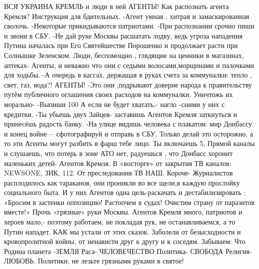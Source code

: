 \obeycr
ВСЯ УКРАИНА КРЕМЛЬ и 
люди в ней АГЕНТЫ!
Как распознать агента Кремля? 
Инструкция для бдительных.
-Агент умная  , хитрая  и  замаскированная  сволочь.
-Некоторые прикидываются патриотами.
-При распознании срочно пиши и звони в СБУ.
-Не дай руке Москвы расшатать лодку, ведь угроза нападения Путина
началась при Его Святейшестве Порошенко и продолжает расти при Солнышке Зеленском.
Люди, беспомощно ,
глядящие на ценники в магазинах, аптеках- Агенты,
и неважно что они с седыми волосами,морщинами и палочками для ходьбы.
-А очередь в кассах,
держащая в руках счета 
за коммуналки: тепло , свет, газ, вода?!  АГЕНТЫ!
-Это они ,подрывают доверие народа к правительству 
путём публичного оглашения своих расходов на коммуналки.
Уничтожь их морально-
-Выпиши 100%
А если не будет хватать,- нагло -сними у них с кредитки. 
-Ты убьешь двух Зайцев- заставишь Агентов Кремля заткнуться и принесёшь радость банку.
-На улице видишь человека с плакатом: 
мир Донбассу и конец войне—
сфотографируй и отправь в СБУ. 
Только делай это осторожно, а то эти Агенты могут разбить в фарш тебе лицо.
Ты включаешь 5, Прямой каналы  и слушаешь, что потерь в зоне АТО нет, 
радуешься  , что Донбасс хоронит маленьких детей- Агентов Кремля.
В «восторге»
 от закрытия   ТВ каналов: NEWSONE, ЗИК, 112.
От преследования ТВ НАШ.
Короче-
Журналистов расплодилось  как тараканов, они проникли во все щели,в каждую прослойку социального быта.
И у них Агентов одна цель-раскачать и  дестабилизировать :
«Бросим в застенки оппозицию!
Растопчем в судах!
Очистим страну от паразитов вместе!»
Прочь «грязные» руки 
Москвы. 
Агентов Кремля много, патриотов и хероев мало,- поэтому работаем, не покладая рук, не останавливаемся, а то Путин нападет.
КАК мы устали от этих сказок. Заболели от безысходности и кровопролитной войны, от ненависти друг к другу и к соседям.
Забываем:
Что Родина планета -ЗЕМЛЯ 
Раса- ЧЕЛОВЕЧЕСТВО
Политика- СВОБОДА
Религия- ЛЮБОВЬ.
Политики, 
не лезьте грязными руками в святое!
\restorecr

